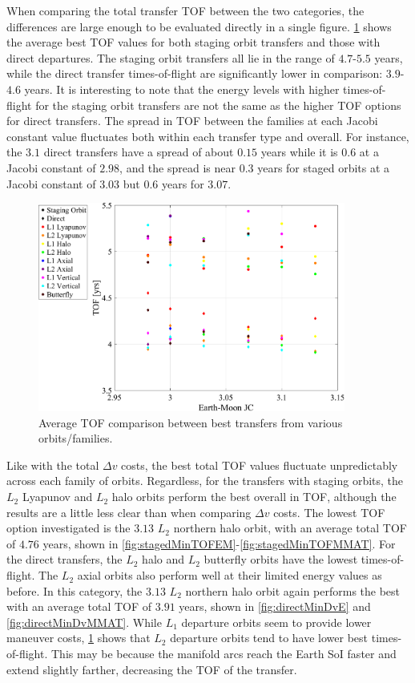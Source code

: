 When comparing the total transfer TOF between the two categories, the differences are large enough
to be evaluated directly in a single figure. \cref{fig:compareTOF} shows the average best TOF
values for both staging orbit transfers and those with direct departures. The staging orbit
transfers all lie in the range of $4.7$-$5.5$ years, while the direct transfer times-of-flight are
significantly lower in comparison: $3.9$-$4.6$ years. It is interesting to note that the energy
levels with higher times-of-flight for the staging orbit transfers are not the same as the higher
TOF options for direct transfers. The spread in TOF between the families at each Jacobi constant
value fluctuates both within each transfer type and overall. For instance, the $3.1$ direct
transfers have a spread of about $0.15$ years while it is $0.6$ at a Jacobi constant of $2.98$, and
the spread is near $0.3$ years for staged orbits at a Jacobi constant of $3.03$ but $0.6$ years for
$3.07$.

\begin{figure}[!htb]
    \centering
    \includegraphics[width=0.9\textwidth]{figures/TOFComparison.pdf}
    \caption{Average TOF comparison between best transfers from various orbits/families.}
    \label{fig:compareTOF}
\end{figure}

Like with the total $\Delta v$ costs, the best total TOF values fluctuate unpredictably across each
family of orbits. Regardless, for the transfers with staging orbits, the $L_{2}$ Lyapunov and
$L_{2}$ halo orbits perform the best overall in TOF, although the results are a little less clear
than when comparing $\Delta v$ costs. The lowest TOF option investigated is the $3.13$ $L_{2}$
northern halo orbit, with an average total TOF of $4.76$ years, shown in
\cref{fig:stagedMinTOFEM}-\cref{fig:stagedMinTOFMMAT}. For the direct transfers, the $L_{2}$ halo
and $L_{2}$ butterfly orbits have the lowest times-of-flight. The $L_{2}$ axial orbits also perform
well at their limited energy values as before. In this category, the $3.13$ $L_{2}$ northern halo
orbit again performs the best with an average total TOF of $3.91$ years, shown in
\cref{fig:directMinDvE} and \cref{fig:directMinDvMMAT}. While $L_{1}$ departure orbits seem to
provide lower maneuver costs, \cref{fig:compareTOF} shows that $L_{2}$ departure orbits tend to
have lower best times-of-flight. This may be because the manifold arcs reach the Earth SoI faster
and extend slightly farther, decreasing the TOF of the transfer.

